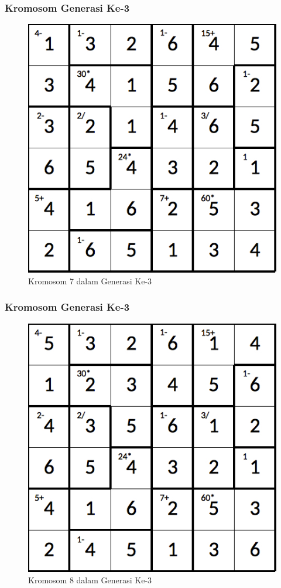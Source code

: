 \documentclass{beamer}
\begin{document}
\begin{frame}
\frametitle{Kromosom Generasi Ke-3}
\begin{figure}
\centering
\captionsetup{justification=centering}
\includegraphics[scale=0.333]{Gambar/hybridgenetic/Generation3Chromosome7}
\caption[Kromosom 7 dalam Generasi Ke-3]{Kromosom 7 dalam Generasi Ke-3}
\label{fig:analisisg3k7}
\end{figure}
\end{frame}

\note{

}

\begin{frame}
\frametitle{Kromosom Generasi Ke-3}
\begin{figure}
\centering
\captionsetup{justification=centering}
\includegraphics[scale=0.333]{Gambar/hybridgenetic/Generation3Chromosome8}
\caption[Kromosom 8 dalam Generasi Ke-3]{Kromosom 8 dalam Generasi Ke-3}
\label{fig:analisisg3k8}
\end{figure}
\end{frame}
\end{document}
